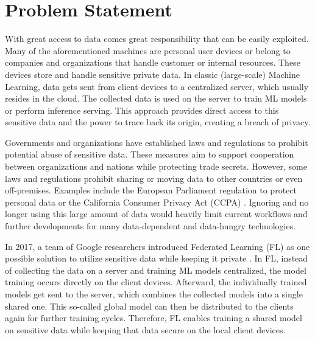 \section{Problem Statement}

With great access to data comes great responsibility that can be easily exploited.
Many of the aforementioned machines are personal user devices or belong to companies and organizations that handle customer or internal resources.
These devices store and handle sensitive private data.
In classic (large-scale) Machine Learning, data gets sent from client devices to a centralized server, which usually resides in the cloud.
The collected data is used on the server to train ML models or perform inference serving.
This approach provides direct access to this sensitive data and the power to trace back its origin, creating a breach of privacy.

Governments and organizations have established laws and regulations to prohibit potential abuse of sensitive data.
These measures aim to support cooperation between organizations and nations while protecting trade secrets.
However, some laws and regulations prohibit sharing or moving data to other countries or even off-premises.
Examples include the European Parliament regulation to protect personal data \cite{eu_regulation} or the California Consumer Privacy Act (CCPA) \cite{california_consumer_privacy_act}.
Ignoring and no longer using this large amount of data would heavily limit current workflows and further developments for many data-dependent and data-hungry technologies.

In 2017, a team of Google researchers introduced Federated Learning (FL) as one possible solution to utilize sensitive data while keeping it private \cite{paper:original_fl}.
In FL, instead of collecting the data on a server and training ML models centralized, the model training occurs directly on the client devices.
Afterward, the individually trained models get sent to the server, which combines the collected models into a single shared one.
This so-called global model can then be distributed to the clients again for further training cycles.
Therefore, FL enables training a shared model on sensitive data while keeping that data secure on the local client devices. 

